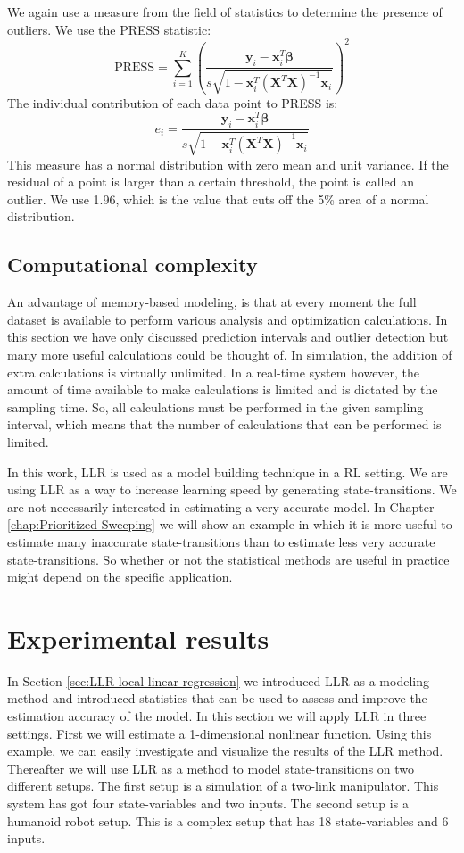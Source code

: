 We again use a measure from the field of statistics to determine the presence of outliers. We use the \ac{PRESS} statistic:
$$
	\textrm{PRESS} = \sum_{i=1}^{K}{ \left( \frac{\mathbf{y}_i - \mathbf{x}_i^T\bm{\beta}}{s\sqrt{1-\mathbf{x}_i^T \left( \bm{X}^T \bm{X} \right)^{-1} \mathbf{x}_i}} \right)^2 }
$$
The individual contribution of each data point to \ac{PRESS} is:
$$
	e_i = \frac{\mathbf{y}_i - \mathbf{x}_i^T\bm{\beta}}{s\sqrt{1-\mathbf{x}_i^T \left( \bm{X}^T \bm{X} \right)^{-1} \mathbf{x}_i}}
$$
This measure has a normal distribution with zero mean and unit variance. If the residual of a point is larger than a certain threshold, the point is called an outlier. We use 1.96, which is the value that cuts off the 5\% area of a normal distribution. 


\subsection{Computational complexity}
An advantage of memory-based modeling, is that at every moment the full dataset is available to perform various analysis and optimization calculations. In this section we have only discussed prediction intervals and outlier detection but many more useful calculations could be thought of. In simulation, the addition of extra calculations is virtually unlimited. In a real-time system however, the amount of time available to make calculations is limited and is dictated by the sampling time. So, all calculations must be performed in the given sampling interval, which means that the number of calculations that can be performed is limited. 

In this work, \ac{LLR} is used as a model building technique in a \ac{RL} setting. We are using \ac{LLR} as a way to increase learning speed by generating state-transitions. We are not necessarily interested in estimating a very accurate model. In Chapter \ref{chap:Prioritized Sweeping} we will show an example in which it is more useful to estimate many inaccurate state-transitions than to estimate less very accurate state-transitions. So whether or not the statistical methods are useful in practice might depend on the specific application.






\section{Experimental results}\label{sec:LLR-results}
In Section \ref{sec:LLR-local linear regression} we introduced \ac{LLR} as a modeling method and introduced statistics that can be used to assess and improve the estimation accuracy of the model. In this section we will apply \ac{LLR} in three settings. First we will estimate a 1-dimensional nonlinear function. Using this example, we can easily investigate and visualize the results of the \ac{LLR} method. Thereafter we will use \ac{LLR} as a method to model state-transitions on two different setups. The first setup is a simulation of a two-link manipulator. This system has got four state-variables and two inputs. The second setup is a humanoid robot setup. This is a complex setup that has 18 state-variables and 6 inputs.

